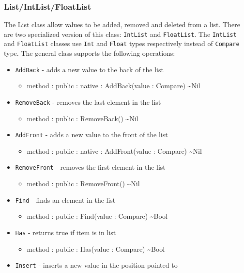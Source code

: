 \documentclass[12pt]{article}
\begin{document}
\subsubsection{List/IntList/FloatList}
The List class allow values to be added, removed and deleted from a
list.  There are two specialized version of this class:
\texttt{IntList} and \texttt{FloatList}.  The \texttt{IntList} and
\texttt{FloatList} classes use \texttt{Int} and \texttt{Float} types
respectively instead of \texttt{Compare} type.  The general class
supports the following operations:
\begin{itemize}
\item \texttt{AddBack} - adds a new value to the back of the list
  \begin{itemize}
  \item method : public : native : AddBack(value : Compare) \textasciitilde Nil
  \end{itemize}
\item \texttt{RemoveBack} - removes the last element in the list
  \begin{itemize}
  \item method : public : RemoveBack() \textasciitilde Nil
  \end{itemize}
\item \texttt{AddFront} - adds a new value to the front of the list
  \begin{itemize}
  \item method : public : native : AddFront(value : Compare) \textasciitilde Nil
  \end{itemize}
\item \texttt{RemoveFront} - removes the first element in the list
  \begin{itemize}
  \item method : public : RemoveFront() \textasciitilde Nil
  \end{itemize}
\item \texttt{Find} - finds an element in the list
  \begin{itemize}
  \item method : public : Find(value : Compare) \textasciitilde Bool
  \end{itemize}
\item \texttt{Has} - returns true if item is in list
  \begin{itemize}
  \item method : public : Has(value : Compare) \textasciitilde Bool
  \end{itemize}
\item \texttt{Insert} - inserts a new value in the position pointed to

\end{itemize}
\end{document}
